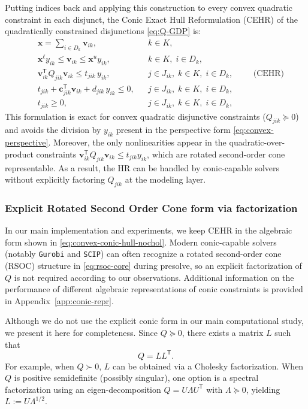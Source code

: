 \documentclass[11pt]{article}
\begin{document}
Putting indices back and applying this construction to every convex quadratic constraint in each disjunct, the Conic Exact Hull Reformulation (CEHR) of the quadratically constrained disjunctions \eqref{eq:Q-GDP} is:
\begingroup
\begin{equation}
\label{eq:convex-conic-hull-nochol}
\begin{aligned}
    &\mathbf x = \sum_{i\in D_k}\mathbf v_{ik}, && k\in K,\\
    &\mathbf x^{\ell}y_{ik}\le \mathbf v_{ik}\le \mathbf x^{u}y_{ik},
        && k\in K,\; i\in D_k,\\
    &\mathbf v_{ik}^{\mathsf T}Q_{jik}\mathbf v_{ik} \le t_{jik}\,y_{ik},
        && j\in J_{ik},\; k\in K,\; i\in D_k,\\
    &t_{jik} + \mathbf c_{jik}^{\mathsf T}\mathbf v_{ik} + d_{jik}\,y_{ik} \le 0,
        && j\in J_{ik},\; k\in K,\; i\in D_k,\\
    &t_{jik}\ge 0,
        && j\in J_{ik},\; k\in K,\; i\in D_k,
\end{aligned}
\qquad \text{(CEHR)}
\end{equation}
\endgroup
This formulation is exact for convex quadratic disjunctive constraints ($Q_{jik}\succeq 0$) and avoids the division by $y_{ik}$ present in the perspective form \eqref{eq:convex-perspective}.
Moreover, the only nonlinearities appear in the quadratic-over-product constraints $\mathbf v_{ik}^{\mathsf T}Q_{jik}\mathbf v_{ik} \le t_{jik}y_{ik}$, which are rotated second-order cone representable.
As a result, the HR can be handled by conic-capable solvers without explicitly factoring
$Q_{jik}$ at the modeling layer.


\subsubsection{Explicit Rotated Second Order Cone form via factorization}

In our main implementation and experiments, we keep CEHR in the algebraic form shown in \eqref{eq:convex-conic-hull-nochol}.
Modern conic-capable solvers (notably \texttt{Gurobi} and \texttt{SCIP}) can often recognize a rotated second-order cone (RSOC) structure in \eqref{eq:rsoc-core} during presolve, so an explicit factorization of $Q$ is not required according to our observations.
Additional information on the performance of different algebraic representations of conic constraints is provided in Appendix~\ref{app:conic-repr}.

Although we do not use the explicit conic form in our main computational study, we present it here for
completeness. Since $Q\succeq 0$, there exists a matrix $L$ such that
\[
    Q = L L^{\mathsf T}.
\]
For example, when $Q\succ 0$, $L$ can be obtained via a Cholesky factorization.
When $Q$ is positive semidefinite (possibly singular), one option is a spectral factorization using an eigen-decomposition $Q = U\Lambda U^{\mathsf T}$ with $\Lambda\succeq 0$, yielding $L := U\Lambda^{1/2}$.
\end{document}
